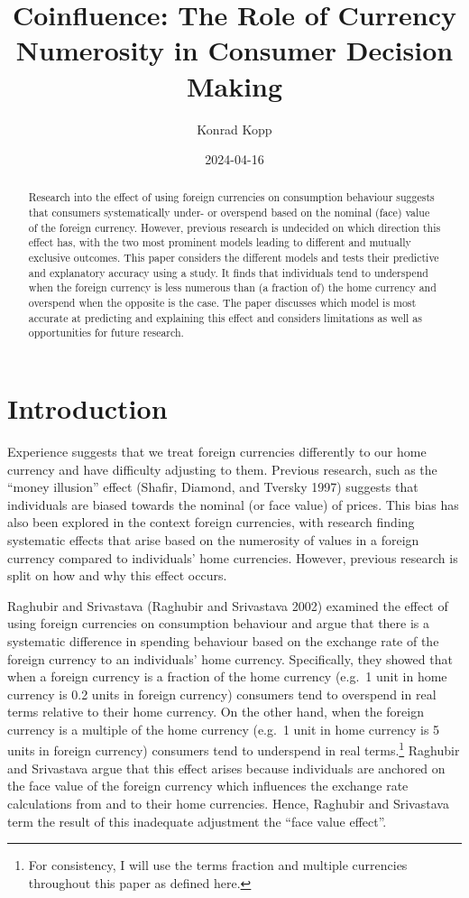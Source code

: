 \documentclass[
]{report}
\title{Coinfluence: The Role of Currency Numerosity in Consumer Decision
Making}
\author{Konrad Kopp}
\affil{%
                  University of Oxford
              }
\date{2024-04-16}
\renewcommand*\contentsname{Table of contents}
\newcommand\contentsname{Table of contents}
\begin{document}
\maketitle
\begin{abstract}
Research into the effect of using foreign currencies on consumption
behaviour suggests that consumers systematically under- or overspend
based on the nominal (face) value of the foreign currency. However,
previous research is undecided on which direction this effect has, with
the two most prominent models leading to different and mutually
exclusive outcomes. This paper considers the different models and tests
their predictive and explanatory accuracy using a study. It finds that
individuals tend to underspend when the foreign currency is less
numerous than (a fraction of) the home currency and overspend when the
opposite is the case. The paper discusses which model is most accurate
at predicting and explaining this effect and considers limitations as
well as opportunities for future research.
\end{abstract}

\renewcommand*\contentsname{Table of contents}
{
\hypersetup{linkcolor=}
\setcounter{tocdepth}{2}
\tableofcontents
}
\chapter{Introduction}\label{introduction}

Experience suggests that we treat foreign currencies differently to our
home currency and have difficulty adjusting to them. Previous research,
such as the ``money illusion'' effect (Shafir, Diamond, and Tversky
1997) suggests that individuals are biased towards the nominal (or face
value) of prices. This bias has also been explored in the context
foreign currencies, with research finding systematic effects that arise
based on the numerosity of values in a foreign currency compared to
individuals' home currencies. However, previous research is split on how
and why this effect occurs.

Raghubir and Srivastava (Raghubir and Srivastava 2002) examined the
effect of using foreign currencies on consumption behaviour and argue
that there is a systematic difference in spending behaviour based on the
exchange rate of the foreign currency to an individuals' home currency.
Specifically, they showed that when a foreign currency is a fraction of
the home currency (e.g.~1 unit in home currency is 0.2 units in foreign
currency) consumers tend to overspend in real terms relative to their
home currency. On the other hand, when the foreign currency is a
multiple of the home currency (e.g.~1 unit in home currency is 5 units
in foreign currency) consumers tend to underspend in real
terms.\footnote{For consistency, I will use the terms fraction and
  multiple currencies throughout this paper as defined here.} Raghubir
and Srivastava argue that this effect arises because individuals are
anchored on the face value of the foreign currency which influences the
exchange rate calculations from and to their home currencies. Hence,
Raghubir and Srivastava term the result of this inadequate adjustment
the ``face value effect''.
\end{document}
